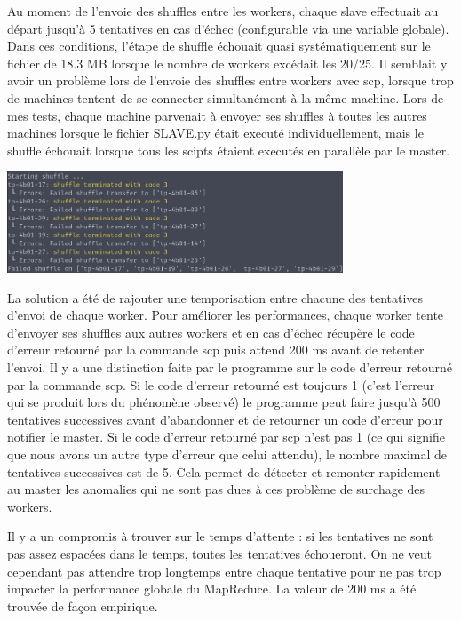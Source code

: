 \documentclass[11pt,a4paper]{article}
\begin{document}
Au moment de l'envoie des shuffles entre les workers, chaque slave effectuait au départ jusqu'à 5 tentatives en cas d'échec (configurable via une variable globale). Dans ces conditions, l'étape de shuffle échouait quasi systématiquement sur le fichier de 18.3 MB lorsque le nombre de workers excédait les 20/25. Il semblait y avoir un problème lors de l'envoie des shuffles entre workers avec scp, lorsque trop de machines tentent de se connecter simultanément à la même machine. Lors de mes tests, chaque machine parvenait à envoyer ses shuffles à toutes les autres machines lorsque le fichier SLAVE.py était executé individuellement, mais le shuffle échouait lorsque tous les scipts étaient executés en parallèle par le master.

\includegraphics[width=10cm]{screenshot_shuffle7.png}

La solution a été de rajouter une temporisation entre chacune des tentatives d'envoi de chaque worker. Pour améliorer les performances, chaque worker tente d'envoyer ses shuffles aux autres workers et en cas d'échec récupère le code d'erreur retourné par la commande scp puis attend 200 ms avant de retenter l'envoi. Il y a une distinction faite par le programme sur le code d'erreur retourné par la commande scp. Si le code d'erreur retourné est toujours 1 (c'est l'erreur qui se produit lors du phénomène observé) le programme peut faire jusqu'à 500 tentatives successives avant d'abandonner et de retourner un code d'erreur pour notifier le master. Si le code d'erreur retourné par scp n'est pas 1 (ce qui signifie que nous avons un autre type d'erreur que celui attendu), le nombre maximal de tentatives successives est de 5. Cela permet de détecter et remonter rapidement au master les anomalies qui ne sont pas dues à ces problème de surchage des workers.

Il y a un compromis à trouver sur le temps d'attente : si les tentatives ne sont pas assez espacées dans le temps, toutes les tentatives échoueront. On ne veut cependant pas attendre trop longtemps entre chaque tentative pour ne pas trop impacter la performance globale du MapReduce. La valeur de 200 ms a été trouvée de façon empirique.
\end{document}
